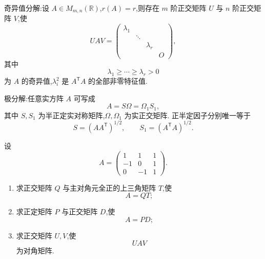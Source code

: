 \begin{theorem}[\markstar]
奇异值分解:设 $A\in M_{m,n}(\mathbb{R})$,$r(A)=r$,则存在 $m$ 阶正交矩阵 $U$ 与 $n$ 阶正交矩阵 $V$,使
\[
UAV=
\begin{pmatrix}
\lambda_1&&&\\
&\ddots&&\\
&&\lambda_r&\\
&&&O
\end{pmatrix},
\]
其中
\[
\lambda_1\ge\cdots\ge\lambda_r>0
\]
为 $A$ 的奇异值,$\lambda_i^2$ 是 $A^{\mathsf T}A$ 的全部非零特征值.
\end{theorem}

\begin{theorem}[\markstar]
极分解:任意实方阵 $A$ 可写成
\[
A=S\Omega=\Omega_1S_1,
\]
其中 $S,S_1$ 为半正定实对称矩阵,$\Omega,\Omega_1$ 为实正交矩阵.
正半定因子分别唯一等于
\[
S=(AA^{\mathsf T})^{1/2},
\qquad
S_1=(A^{\mathsf T}A)^{1/2}.
\]
\end{theorem}


\begin{example}
设
\[
A=
\begin{pmatrix}
1&1&1\\
-1&0&1\\
0&-1&1
\end{pmatrix}.
\]
\begin{enumerate}
    \item 求正交矩阵 $Q$ 与主对角元全正的上三角矩阵 $T$,使
    \[
    A=QT;
    \]
    \item 求正定矩阵 $P$ 与正交矩阵 $D$,使
    \[
    A=PD;
    \]
    \item 求正交矩阵 $U,V$,使
    \[
    UAV
    \]
    为对角矩阵.
\end{enumerate}
\end{example}
\exampleblank

